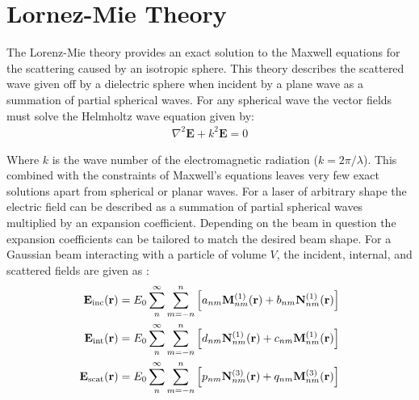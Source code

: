 \section{Lornez-Mie Theory}

The Lorenz-Mie theory provides an exact solution to the Maxwell 
equations for the scattering caused by an isotropic sphere. This 
theory describes the scattered wave given off by a dielectric 
sphere when incident by a plane wave as a summation of partial 
spherical waves. For any spherical wave the vector fields must 
solve the Helmholtz wave equation given by:
\begin{align}
	\nabla^2\mathbf{E} +k^2\mathbf{E} = 0
\end{align} 

Where $k$ is the wave number of the electromagnetic radiation 
($k = 2\pi/\lambda$). This combined with the constraints of 
Maxwell's equations leaves very few exact solutions apart from 
spherical or planar waves. For a laser of arbitrary shape the 
electric field can be described as a summation of partial 
spherical waves multiplied by an expansion coefficient. Depending 
on the beam in question the expansion coefficients can be tailored
to match the desired beam shape. For a Gaussian beam interacting 
with a particle of volume $V$, the incident, internal, and 
scattered fields are given as \cite{RanhaNeves2019}: 
\begin{align}
	\label{eq:incident}
	{\bf E}_{\rm inc}({\bf r})
	&=
	E_0 \sum_{n}^\infty\sum_{m=-n}^n \left[
	a_{nm}{\bf M}_{nm}^{(1)}({\bf r})
	+ b_{nm}{\bf N}_{nm}^{(1)}({\bf r})\right]
	\\
	\label{eq:internal}
	{\bf E}_{\rm int}({\bf r})
	&=
	E_0 \sum_{n}^\infty \sum_{m=-n}^{n}\left[
	d_{nm}{\bf N}_{nm}^{(1)}({\bf r}) + c_{nm}{\bf M}_{nm}^{(1)}({\bf r})
	\right]
	\\
	\label{eq:scattered}
	{\bf E}_{\rm scat}({\bf r})
	&=
	E_0 \sum_{n}^\infty \sum_{m=-n}^n\left[
	p_{nm}{\bf N}_{nm}^{(3)}({\bf r})+q_{nm}{\bf M}_{nm}^{(3)}({\bf r})
	\right] 
\end{align}

